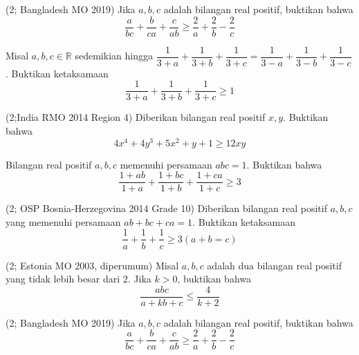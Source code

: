 \documentclass[11pt]{scrartcl}
\begin{document}
\begin{problem}
(2; Bangladesh MO 2019) Jika $a, b, c$ adalah bilangan real positif, buktikan bahwa \[\dfrac{a}{bc} + \dfrac{b}{ca} + \dfrac{c}{ab} \geq \dfrac{2}{a} + \dfrac{2}{b} - \dfrac{2}{c}\]
\end{problem}

\begin{problem}
Misal $a, b, c \in \mathbb{R}$ sedemikian hingga $\dfrac{1}{3 + a} + \dfrac{1}{3 + b} + \dfrac{1}{3 + c} = \dfrac{1}{3 - a} + \dfrac{1}{3 - b} + \dfrac{1}{3 - c}$. Buktikan ketaksamaan \[\dfrac{1}{3 + a} + \dfrac{1}{3 + b} + \dfrac{1}{3 + c} \geq 1\]
\end{problem}

\begin{problem}
(2;India RMO 2014 Region 4) Diberikan bilangan real positif $x, y$. Buktikan bahwa \[4x^4 + 4y^3 + 5x^2 + y + 1 \geq 12xy\]
\end{problem}

\begin{problem}

Bilangan real positif $a, b, c$ memenuhi persamaan $abc = 1$. Buktikan bahwa \[\dfrac{1 + ab}{1 + a} + \dfrac{1 + bc}{1 + b} + \dfrac{1 + ca}{1 + c} \geq 3\]

\end{problem}

\begin{problem}

(2; OSP Bosnia-Herzegovina 2014 Grade 10) Diberikan bilangan real positif $a, b, c$ yang memenuhi persamaan $ab + bc + ca = 1$. Buktikan ketaksamaan \[\dfrac{1}{a} + \dfrac{1}{b} + \dfrac{1}{c} \geq 3(a + b = c)\]

\end{problem}

\begin{problem}

(2; Estonia MO 2003, diperumum) Misal $a, b, c$ adalah dua bilangan real positif yang tidak lebih besar dari $2$. Jika $k > 0$, buktikan bahwa \[\dfrac{abc}{a + kb + c} \leq \dfrac{4}{k + 2}\]

\end{problem}

\begin{problem}

(2; Bangladesh MO 2019) Jika $a, b, c$ adalah bilangan real positif, buktikan bahwa \[\dfrac{a}{bc} + \dfrac{b}{ca} + \dfrac{c}{ab} \geq \dfrac{2}{a} + \dfrac{2}{b} - \dfrac{2}{c}\]

\end{problem}
\end{document}
